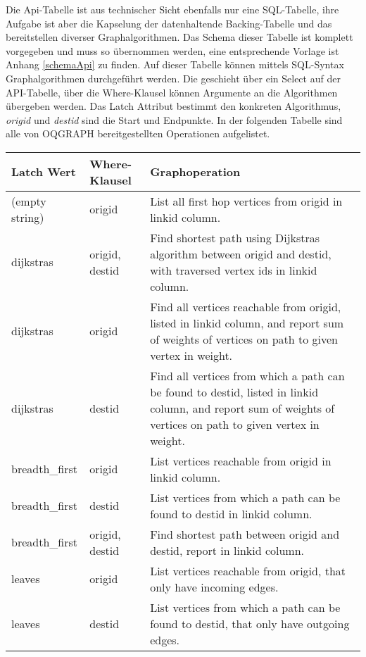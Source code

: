 Die Api-Tabelle ist aus technischer Sicht ebenfalls nur eine SQL-Tabelle, ihre Aufgabe ist aber die Kapselung der datenhaltende Backing-Tabelle und das bereitstellen diverser Graphalgorithmen. Das Schema dieser Tabelle ist komplett vorgegeben und muss so übernommen werden, eine entsprechende Vorlage ist Anhang \ref{schemaApi} zu finden. Auf dieser Tabelle können mittels SQL-Syntax Graphalgorithmen durchgeführt werden. Die geschieht über ein Select auf der API-Tabelle, über die Where-Klausel können Argumente an die Algorithmen übergeben werden. Das Latch Attribut bestimmt den konkreten Algorithmus, \emph{origid} und \emph{destid} sind die Start und Endpunkte. In der folgenden Tabelle sind alle von OQGRAPH bereitgestellten Operationen aufgelistet.

\begin{tabularx}{\textwidth}{l l X}
	\textbf{Latch Wert }    & \textbf{Where-Klausel}  & \textbf{Graphoperation} \\
	\hline
	(empty string) & origid         & List all first hop vertices from origid in linkid column. \\
	dijkstras      & origid, destid & Find shortest path using Dijkstras algorithm between origid and destid, with traversed vertex ids in linkid column. \\
	dijkstras      & origid         & Find all vertices reachable from origid, listed in linkid column, and report sum of weights of vertices on path to given vertex in weight. \\
	dijkstras      & destid         & Find all vertices from which a path can be found to destid, listed in linkid column, and report sum of weights of vertices on path to given vertex in weight. \\
	breadth\_first & origid         & List vertices reachable from origid in linkid column. \\
	breadth\_first & destid         & List vertices from which a path can be found to destid in linkid column. \\
	breadth\_first & origid, destid & Find shortest path between origid and destid, report in linkid column. \\
	leaves         & origid         & List vertices reachable from origid, that only have incoming edges. \\
	leaves         & destid         & List vertices from which a path can be found to destid, that only have outgoing edges.
\end{tabularx}


